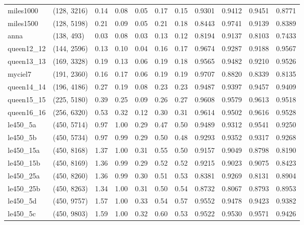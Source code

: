 \begin{tabular}{llrrrrrrrrr}
 miles1000 &  (128, 3216) &  0.14 & 0.08 & 0.05 &  0.17 &   0.15 &   0.9301 &   0.9412 &     0.9451 &      0.8771 \\
 miles1500 &  (128, 5198) &  0.21 & 0.09 & 0.05 &  0.21 &   0.18 &   0.8443 &   0.9741 &     0.9139 &      0.8389 \\
      anna &   (138, 493) &  0.03 & 0.08 & 0.03 &  0.13 &   0.12 &   0.8194 &   0.9137 &     0.8103 &      0.7433 \\
queen12\_12 &  (144, 2596) &  0.13 & 0.10 & 0.04 &  0.16 &   0.17 &   0.9674 &   0.9287 &     0.9188 &      0.9567 \\
queen13\_13 &  (169, 3328) &  0.19 & 0.13 & 0.06 &  0.19 &   0.18 &   0.9565 &   0.9482 &     0.9210 &      0.9526 \\
   myciel7 &  (191, 2360) &  0.16 & 0.17 & 0.06 &  0.19 &   0.19 &   0.9707 &   0.8820 &     0.8339 &      0.8135 \\
queen14\_14 &  (196, 4186) &  0.27 & 0.19 & 0.08 &  0.23 &   0.23 &   0.9487 &   0.9397 &     0.9457 &      0.9409 \\
queen15\_15 &  (225, 5180) &  0.39 & 0.25 & 0.09 &  0.26 &   0.27 &   0.9608 &   0.9579 &     0.9613 &      0.9518 \\
queen16\_16 &  (256, 6320) &  0.53 & 0.32 & 0.12 &  0.30 &   0.31 &   0.9614 &   0.9502 &     0.9616 &      0.9528 \\
  le450\_5a &  (450, 5714) &  0.97 & 1.00 & 0.29 &  0.47 &   0.50 &   0.9489 &   0.9312 &     0.9541 &      0.9250 \\
  le450\_5b &  (450, 5734) &  0.97 & 0.99 & 0.29 &  0.50 &   0.48 &   0.9293 &   0.9352 &     0.9317 &      0.9268 \\
 le450\_15a &  (450, 8168) &  1.37 & 1.00 & 0.31 &  0.55 &   0.50 &   0.9157 &   0.9049 &     0.8798 &      0.8190 \\
 le450\_15b &  (450, 8169) &  1.36 & 0.99 & 0.29 &  0.52 &   0.52 &   0.9215 &   0.9023 &     0.9075 &      0.8423 \\
 le450\_25a &  (450, 8260) &  1.36 & 0.99 & 0.30 &  0.51 &   0.53 &   0.8381 &   0.9269 &     0.8131 &      0.8904 \\
 le450\_25b &  (450, 8263) &  1.34 & 1.00 & 0.31 &  0.50 &   0.54 &   0.8732 &   0.8067 &     0.8793 &      0.8953 \\
  le450\_5d &  (450, 9757) &  1.57 & 1.00 & 0.33 &  0.54 &   0.57 &   0.9552 &   0.9478 &     0.9423 &      0.9382 \\
  le450\_5c &  (450, 9803) &  1.59 & 1.00 & 0.32 &  0.60 &   0.53 &   0.9522 &   0.9530 &     0.9571 &      0.9426 \\

\end{tabular}
